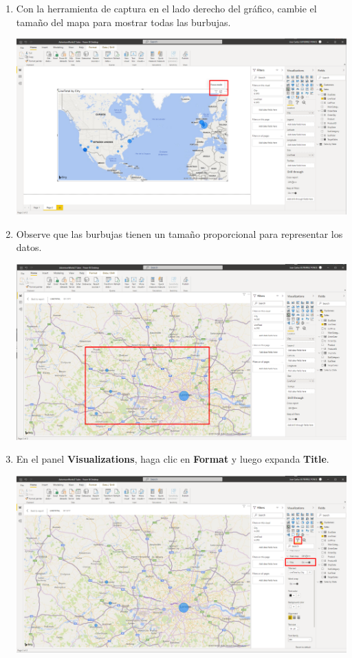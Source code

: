 \documentclass[12pt,letterpaper]{article}
\newcommand\tab[1][1cm]{\hspace*{#1}}
\begin{document}
\begin{enumerate}[\tab 1.]
\begin{center}
        \end{center}
        \item Con la herramienta de captura en el lado derecho del gráfico, cambie el tamaño del mapa para mostrar todas las burbujas.
        \begin{center}
            \includegraphics[width=13cm]{./img/img122.png}
        \end{center}
        \item Observe que las burbujas tienen un tamaño proporcional para representar los datos.
        \begin{center}
            \includegraphics[width=13cm]{./img/img123.png}
        \end{center}
        \item En el panel \textbf{Visualizations}, haga clic en \textbf{Format} y luego expanda \textbf{Title}.
        \begin{center}
            \includegraphics[width=13cm]{./img/img124.png}

\end{center}
\end{enumerate}
\end{document}
